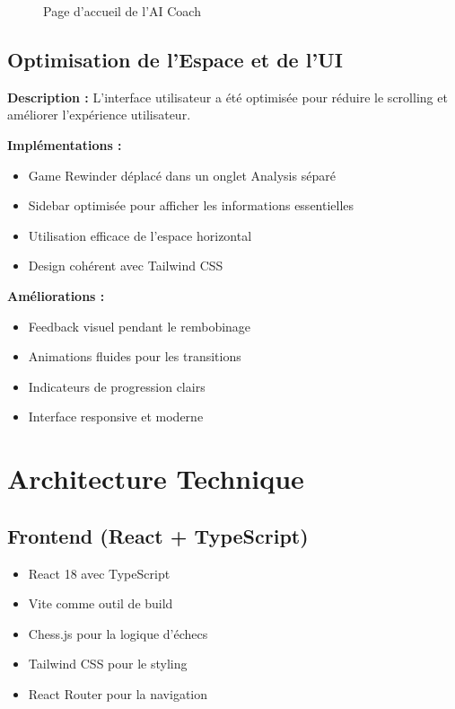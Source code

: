 \documentclass[a4paper,12pt]{article}
\begin{document}
\begin{figure}[h]
    \centering
    \caption{Page d'accueil de l'AI Coach}
    \label{fig:coach}
\end{figure}

\subsection{Optimisation de l'Espace et de l'UI}

\textbf{Description :}
L'interface utilisateur a été optimisée pour réduire le scrolling et améliorer l'expérience utilisateur.

\textbf{Implémentations :}
\begin{itemize}
    \item Game Rewinder déplacé dans un onglet Analysis séparé
    \item Sidebar optimisée pour afficher les informations essentielles
    \item Utilisation efficace de l'espace horizontal
    \item Design cohérent avec Tailwind CSS
\end{itemize}

\textbf{Améliorations :}
\begin{itemize}
    \item Feedback visuel pendant le rembobinage
    \item Animations fluides pour les transitions
    \item Indicateurs de progression clairs
    \item Interface responsive et moderne
\end{itemize}

\section{Architecture Technique}

\subsection{Frontend (React + TypeScript)}
\begin{itemize}
    \item React 18 avec TypeScript
    \item Vite comme outil de build
    \item Chess.js pour la logique d'échecs
    \item Tailwind CSS pour le styling
    \item React Router pour la navigation
\end{itemize}
\end{document}

